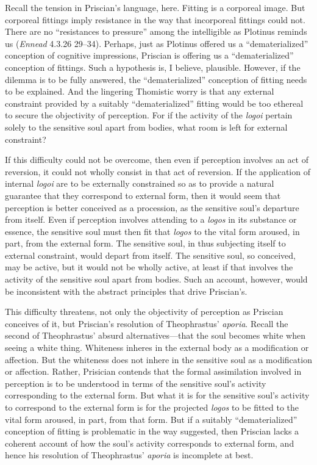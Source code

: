 \documentclass[12pt]{article}
\begin{document}
Recall the tension in Priscian's language, here. Fitting is a corporeal image. But corporeal fittings imply resistance in the way that incorporeal fittings could not. There are no ``resistances to pressure'' among the intelligible as Plotinus reminds us (\emph{Ennead} 4.3.26 29--34). Perhaps, just as Plotinus offered us a ``dematerialized'' conception of cognitive impressions, Priscian is offering us a ``dematerialized'' conception of fittings. Such a hypothesis is, I believe, plausible. However, if the dilemma is to be fully answered, the ``dematerialized'' conception of fitting needs to be explained. And the lingering Thomistic worry is that any external constraint provided by a suitably ``dematerialized'' fitting would be too ethereal to secure the objectivity of perception. For if the activity of the \emph{logoi} pertain solely to the sensitive soul apart from bodies, what room is left for external constraint? 

If this difficulty could not be overcome, then even if perception involves an act of reversion, it could not wholly consist in that act of reversion. If the application of internal \emph{logoi} are to be externally constrained so as to provide a natural guarantee that they correspond to external form, then it would seem that perception is better conceived as a procession, as the sensitive soul's departure from itself. Even if perception involves attending to a \emph{logos} in its substance or essence, the sensitive soul must then fit that \emph{logos} to the vital form aroused, in part, from the external form. The sensitive soul, in thus subjecting itself to external constraint, would depart from itself. The sensitive soul, so conceived, may be active, but it would not be wholly active, at least if that involves the activity of the sensitive soul apart from bodies. Such an account, however, would be inconsistent with the abstract principles that drive Priscian's.

This difficulty threatens, not only the objectivity of perception as Priscian conceives of it, but Priscian's resolution of Theophrastus' \emph{aporia}. Recall the second of Theophrastus' absurd alternatives---that the soul becomes white when seeing a white thing. Whiteness inheres in the external body as a modification or affection. But the whiteness does not inhere in the sensitive soul as a modification or affection. Rather, Prisician contends that the formal assimilation involved in perception is to be understood in terms of the sensitive soul's activity corresponding to the external form. But what it is for the sensitive soul's activity to correspond to the external form is for the projected \emph{logos} to be fitted to the vital form aroused, in part, from that form. But if a suitably ``dematerialized'' conception of fitting is problematic in the way suggested, then Priscian lacks a coherent account of how the soul's activity corresponds to external form, and hence his resolution of Theophrastus' \emph{aporia} is incomplete at best.






\end{document}
